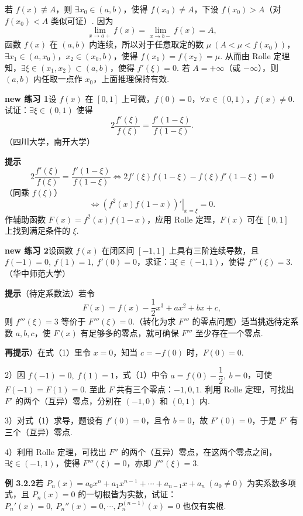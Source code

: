 \documentclass[UTF8,12pt,a4paper,fontset=fandol]{ctexart}
\begin{document}
若 $f(x)\not\equiv A$，则 $\exists x_0\in(a,b)$，使得 $f(x_0)\ne A$，下设 $f(x_0)>A$（对 $f(x_0)<A$ 类似可证）. 因为
\[
  \lim_{x\to a+}f(x)=\lim_{x\to b-}f(x)=A,
\]
函数 $f(x)$ 在 $(a,b)$ 内连续，所以对于任意取定的数 $\mu\ (A<\mu<f(x_0))$，$\exists x_1\in(a,x_0)$，$x_2\in(x_0,b)$，使得 $f(x_1)=f(x_2)=\mu$. 从而由 Rolle 定理知，$\exists\xi\in(x_1,x_2)\subset(a,b)$，使得 $f'(\xi)=0$. 若 $A=+\infty$（或 $-\infty$），则 $(a,b)$ 内任取一点作 $x_0$，上面推理保持有效.

\noindent\textbf{new 练习 1}\quad 设 $f(x)$ 在 $[0,1]$ 上可微，$f(0)=0$，$\forall x\in(0,1)$，$f(x)\ne0$. 试证：$\exists\xi\in(0,1)$ 使得
\[
  2\frac{f'(\xi)}{f(\xi)}=\frac{f'(1-\xi)}{f(1-\xi)}.
\]
（四川大学，南开大学）

\noindent\textbf{提示}\quad
\[
  2\frac{f'(\xi)}{f(\xi)}=\frac{f'(1-\xi)}{f(1-\xi)}
  \Longleftrightarrow
  2f'(\xi)f(1-\xi)-f(\xi)f'(1-\xi)=0
\]
（同乘 $f(\xi)$）
\[
  \Longleftrightarrow
  \left.(f^2(x)f(1-x))'\right|_{x=\xi}=0.
\]
作辅助函数 $F(x)=f^2(x)f(1-x)$，应用 Rolle 定理，$F(x)$ 可在 $[0,1]$ 上找到满足条件的 $\xi$.

\noindent\textbf{new 练习 2}\quad 设函数 $f(x)$ 在闭区间 $[-1,1]$ 上具有三阶连续导数，且 $f(-1)=0,\ f(1)=1,\ f'(0)=0$，求证：$\exists\xi\in(-1,1)$，使得 $f'''(\xi)=3$.（华中师范大学）

\noindent\textbf{提示}\quad （待定系数法）若令
\begin{equation}
  F(x)=f(x)-\frac12x^3+ax^2+bx+c,
\tag{1}
\end{equation}
则 $f'''(\xi)=3$ 等价于 $F'''(\xi)=0$.（转化为求 $F'''$ 的零点问题）适当挑选待定系数 $a,b,c$，使 $F(x)$ 有足够多的零点，就可确保 $F'''$ 至少存在一个零点.

\noindent\textbf{再提示}）在式（1）里令 $x=0$，知当 $c=-f(0)$ 时，$F(0)=0$.

2）因 $f(-1)=0,\ f(1)=1$，式（1）中令 $a=f(0)-\dfrac12,\ b=0$，可使 $F(-1)=F(1)=0$. 至此 $F$ 共有三个零点：$-1,0,1$. 利用 Rolle 定理，可找出 $F'$ 的两个（互异）零点，分别在 $(-1,0)$ 和 $(0,1)$ 内.

3）对式（1）求导，题设有 $f'(0)=0$，且令 $b=0$，故 $F'(0)=0$，于是 $F'$ 有三个（互异）零点.

4）利用 Rolle 定理，可找出 $F''$ 的两个（互异）零点，在这两个零点之间，$\exists\xi\in(-1,1)$，使得 $F'''(\xi)=0$，亦即 $f'''(\xi)=3$.

\noindent\textbf{例 3.2.2}\quad 若 $P_n(x)=a_0x^n+a_1x^{n-1}+\cdots+a_{n-1}x+a_n\ (a_0\ne0)$ 为实系数多项式，且 $P_n(x)=0$ 的一切根皆为实数，试证：$P_n'(x)=0,\ P_n''(x)=0,\cdots,P_n^{(n-1)}(x)=0$ 也仅有实根.
\end{document}
